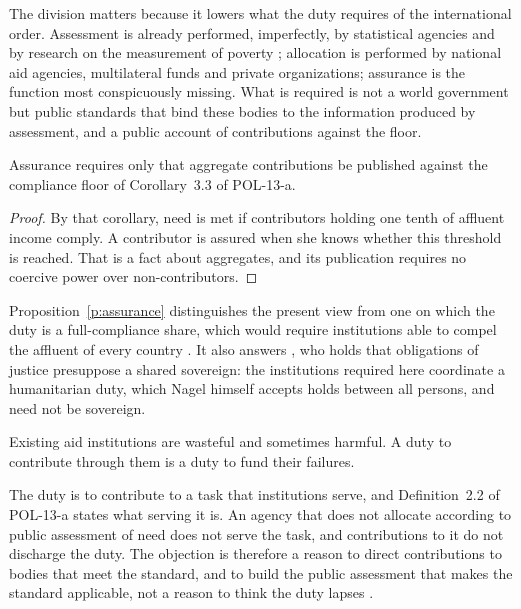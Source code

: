 \documentclass{situationist-preprint}
\begin{document}
The division matters because it lowers what the duty requires of the international order. Assessment is already performed, imperfectly, by statistical agencies and by research on the measurement of poverty \citep{Pogge2002}; allocation is performed by national aid agencies, multilateral funds and private organizations; assurance is the function most conspicuously missing. What is required is not a world government but public standards that bind these bodies to the information produced by assessment, and a public account of contributions against the floor.

\begin{proposition}\label{p:assurance}
Assurance requires only that aggregate contributions be published against the compliance floor of Corollary~3.3 of POL-13-a.
\end{proposition}

\begin{proof}
By that corollary, need is met if contributors holding one tenth of affluent income comply. A contributor is assured when she knows whether this threshold is reached. That is a fact about aggregates, and its publication requires no coercive power over non-contributors.
\end{proof}

Proposition~\ref{p:assurance} distinguishes the present view from one on which the duty is a full-compliance share, which would require institutions able to compel the affluent of every country \citep{Murphy2000}. It also answers \citet{Nagel2005}, who holds that obligations of justice presuppose a shared sovereign: the institutions required here coordinate a humanitarian duty, which Nagel himself accepts holds between all persons, and need not be sovereign.

\begin{objection}
Existing aid institutions are wasteful and sometimes harmful. A duty to contribute through them is a duty to fund their failures.
\end{objection}

\begin{reply}
The duty is to contribute to a task that institutions serve, and Definition~2.2 of POL-13-a states what serving it is. An agency that does not allocate according to public assessment of need does not serve the task, and contributions to it do not discharge the duty. The objection is therefore a reason to direct contributions to bodies that meet the standard, and to build the public assessment that makes the standard applicable, not a reason to think the duty lapses \citep{Singer1972}.
\end{reply}
\end{document}
